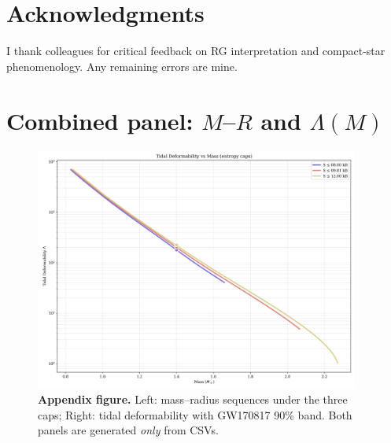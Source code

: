 \documentclass[11pt]{article}
\begin{document}
\section*{Acknowledgments}
I thank colleagues for critical feedback on RG interpretation and compact-star phenomenology. Any remaining errors are mine.

\appendix
\section{Combined panel: $M$--$R$ and $\Lambda(M)$}
\label{sec:appendix-fig}
\begin{figure}[h!]
\centering
\includegraphics[width=0.95\textwidth]{appendix_fig_a1.png}
\caption{\textbf{Appendix figure.} Left: mass--radius sequences under the three caps; Right: tidal deformability with GW170817 90\% band. Both panels are generated \emph{only} from CSVs.}
\end{figure}
\end{document}
